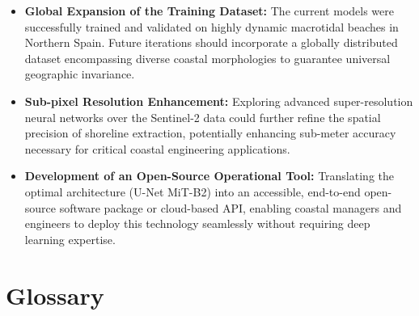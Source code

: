 ﻿\documentclass[ENG]{TFUOC}%
\begin{document}
\begin{itemize}
    \item \textbf{Global Expansion of the Training Dataset:} The current models were successfully trained and validated on highly dynamic macrotidal beaches in Northern Spain. Future iterations should incorporate a globally distributed dataset encompassing diverse coastal morphologies to guarantee universal geographic invariance.
    \item \textbf{Sub-pixel Resolution Enhancement:} Exploring advanced super-resolution neural networks over the Sentinel-2 data could further refine the spatial precision of shoreline extraction, potentially enhancing sub-meter accuracy necessary for critical coastal engineering applications.
    \item \textbf{Development of an Open-Source Operational Tool:} Translating the optimal architecture (U-Net MiT-B2) into an accessible, end-to-end open-source software package or cloud-based API, enabling coastal managers and engineers to deploy this technology seamlessly without requiring deep learning expertise.
\end{itemize}

\chapter{Glossary}
\end{document}
